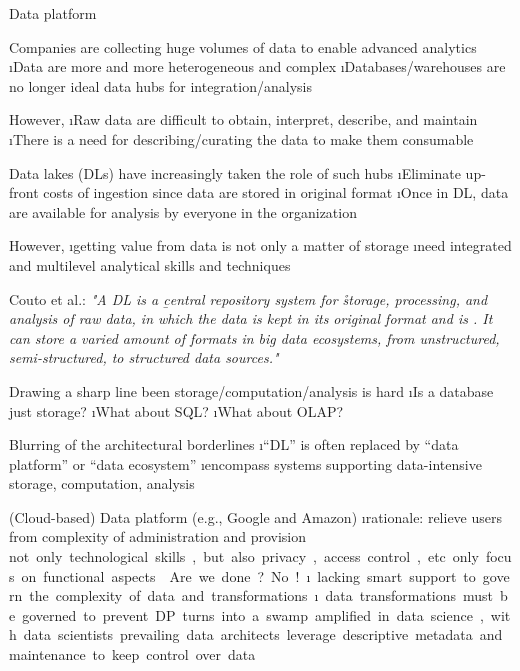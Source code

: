 \begin{frame}[allowframebreaks]{Data platform}

Companies are collecting huge volumes of data to enable advanced analytics 
\i Data are more and more heterogeneous and complex
\i Databases/warehouses are no  longer ideal data hubs for integration/analysis

However, 
\i Raw data are difficult to obtain, interpret, describe, and maintain
\i There is a need for describing/curating the data to make them consumable

Data lakes (DLs) have increasingly taken the role of such hubs
\i Eliminate up-front costs of ingestion since data are stored in original format
\i Once in DL, data are available for analysis by everyone in the organization

\framebreak

However, 
\i getting  value  from  data  is  not  only  a  matter of storage
\i need integrated and multilevel analytical skills and techniques

Couto et al.: \textit{"A DL is a \b{central} repository system for \r{storage, processing, and analysis} of raw data, in which the data is kept in its original format and is .  It can store a varied amount of formats in big data ecosystems, from unstructured, semi-structured, to structured data sources."}

\framebreak

Drawing a sharp line been storage/computation/analysis is hard
\i Is a database just storage?
\i What about SQL?
\i What about OLAP?

Blurring of the architectural borderlines
\i ``DL'' is often replaced by ``data platform'' or ``data ecosystem''
\i encompass systems supporting data-intensive storage, computation, analysis

(Cloud-based) Data platform (e.g., Google and Amazon)
\i rationale: relieve users from complexity of administration and provision
\si not only technological skills, but also privacy, access control, etc.
\si only focus on functional aspects

\framebreak

Are we done? No!
\i lacking smart support to govern the complexity of data and transformations
\i data transformations must be governed to prevent DP turns into a swamp
\si amplified in data science, with data scientists prevailing data architects
\si leverage descriptive metadata and maintenance to keep control over data


\end{frame}
